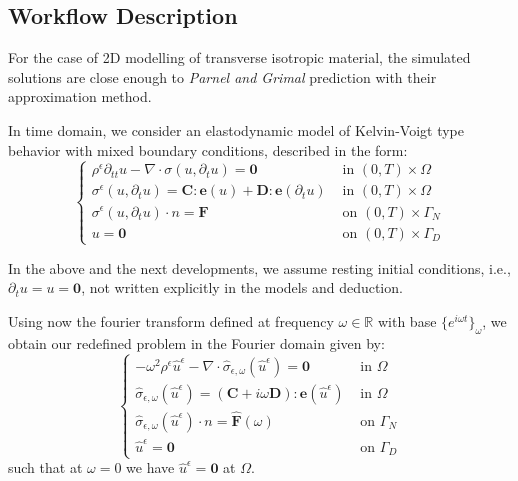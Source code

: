 \subsection{Workflow Description}
\begin{rem}
For the case of 2D modelling of transverse isotropic material, the simulated solutions are close enough to \textit{Parnel and Grimal} prediction with their approximation method.
\end{rem}
In time domain, we consider an elastodynamic model of Kelvin-Voigt type behavior with mixed boundary conditions, described in the form:
\begin{equation*}
    \left \{
    \begin{array}{cc}
        \rho^{\epsilon}\partial_{tt}u - \nabla \cdot \sigma(u, \partial_t u) = \mathbf{0} & \text{ in } (0,T)\times \Omega \\
        \sigma^{\epsilon}(u,\partial_t u)  = \mathbf{C}:\mathbf{e}(u) + \mathbf{D}:\mathbf{e}(\partial_t u) & \text{ in } (0,T)\times\Omega \\
        \sigma^{\epsilon}(u, \partial_t u)\cdot n = \mathbf{F} & \text{ on }(0,T)\times \Gamma_N \\ 
        u = \mathbf{0} & \text{ on } (0,T)\times \Gamma_D
    \end{array}
    \right .
\end{equation*}
\begin{rem}
In the above and the next developments, we assume resting initial conditions, i.e., $\partial_t u = u = \mathbf{0}$, not written explicitly in the models and deduction.
\end{rem}
Using now the fourier transform defined at frequency $\omega \in \mathbb{R}$ with base $\{e^{i\omega t}\}_{\omega}$, we obtain our redefined problem in the Fourier domain given by:
\begin{equation*}
    \left \{
    \begin{array}{cc}
        -\omega^2 \rho^{\epsilon} \hat{u}^{\epsilon} - \nabla \cdot \hat{\sigma}_{\epsilon,\omega}(\hat{u}^{\epsilon}) = \mathbf{0} & \text{ in } \Omega  \\
        \hat{\sigma}_{\epsilon,\omega} (\hat{u}^{\epsilon}) = (\mathbf{C} + i\omega \mathbf{D}):\mathbf{e}(\hat{u}^{\epsilon}) & \text{ in } \Omega \\
        \hat{\sigma}_{\epsilon,\omega} (\hat{u}^{\epsilon}) \cdot n = \hat{\mathbf{F}}(\omega) & \text{ on } \Gamma_N \\
        \hat{u}^{\epsilon} = \mathbf{0} & \text{ on } \Gamma_D
    \end{array}
    \right .
\end{equation*}
such that at $\omega = 0$ we have $\hat{u}^{\epsilon}=\mathbf{0}$ at $\Omega$.\\


